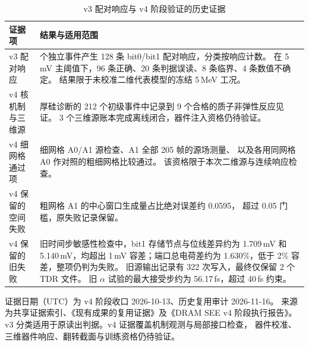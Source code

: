 \begin{table}[tbp]
  \centering
  \small
  \caption{v3 配对响应与 v4 阶段验证的历史证据}
  \label{tab:v3-v4-historical-evidence}
  \begin{tabularx}{\linewidth}{@{}l>{\raggedright\arraybackslash}X@{}}
    \toprule
    证据项 & 结果与适用范围 \\
    \midrule
    v3 配对响应 &
    64 个独立事件产生 128 条 bit0/bit1 配对响应，分类按响应计数。
    在 5\,mV 主阈值下，96 条正确、20 条判据误读、8 条临界、4 条数值不确定。
    结果限于未校准二维代表模型的冻结 5\,MeV 工况。 \\
    v4 核机制与三维源 &
    厚硅诊断的 212 个初级事件中记录到 9 个合格的质子非弹性反应见证。
    3 个三维源账本完成离线闭合，器件注入资格仍待验证。 \\
    v4 细网格通过项 &
    细网格 A0/A1 源检查、A1 全部 205 帧的源场测量、
    以及各用同网格 A0 作对照的粗细网格比较通过。
    该资格限于本次二维源与连续响应检查。 \\
    v4 保留的空间失败 &
    粗网格 A1 的中心窗口生成量占比绝对误差约 0.0595，
    超过 0.05 门槛，原失败记录保留。 \\
    v4 保留的旧失败 &
    旧时间步敏感性检查中，bit1 存储节点与位线差异约为
    1.709\,mV 和 5.140\,mV，均超出 1\,mV 容差；端口总电荷差约为
    1.630\%，低于 2\% 容差，整项仍判为失败。
    旧源输出记录有 322 次写入，最终仅保留 2 个 TDR 文件。
    旧 \(\alpha\) 试验的最大接受步约为 56.17\,fs，超过 40\,fs 约束。 \\
    \bottomrule
  \end{tabularx}
  \par\smallskip
  \begin{minipage}{\linewidth}
    \footnotesize
    证据日期（UTC）为 v4 阶段收口 2026-10-13、历史复用审计 2026-11-16。
    来源为共享证据索引、《现有成果的复用证据》及《DRAM SEE v4 阶段执行报告》。
    v3 分类适用于原读出判据。v4 证据覆盖机制观测与局部接口检查，
    器件校准、三维器件响应、翻转截面与训练资格仍待验证。
  \end{minipage}
\end{table}
